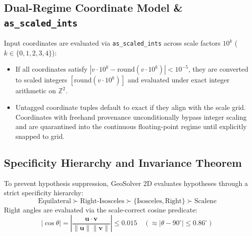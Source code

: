 \documentclass[preprint,12pt]{elsarticle}
\begin{document}
\subsection{Dual-Regime Coordinate Model \& \texttt{as\_scaled\_ints}}
Input coordinates are evaluated via \texttt{as\_scaled\_ints} across scale factors $10^k$ ($k \in \{0, 1, 2, 3, 4\}$):
\begin{itemize}
    \item If all coordinates satisfy $|v \cdot 10^k - \text{round}(v \cdot 10^k)| < 10^{-5}$, they are converted to scaled integers $[\text{round}(v \cdot 10^k)]$ and evaluated under exact integer arithmetic on $\mathbb{Z}^2$.
    \item Untagged coordinate tuples default to exact if they align with the scale grid. Coordinates with freehand provenance unconditionally bypass integer scaling and are quarantined into the continuous floating-point regime until explicitly snapped to grid.
\end{itemize}

\subsection{Specificity Hierarchy and Invariance Theorem}
To prevent hypothesis suppression, GeoSolver 2D evaluates hypotheses through a strict specificity hierarchy:
\begin{equation}
\text{Equilateral} \succ \text{Right-Isosceles} \succ \{\text{Isosceles}, \text{Right}\} \succ \text{Scalene}
\end{equation}
Right angles are evaluated via the scale-correct cosine predicate:
\begin{equation}
|\cos \theta| = \left| \frac{\mathbf{u} \cdot \mathbf{v}}{\|\mathbf{u}\| \|\mathbf{v}\|} \right| \le 0.015 \quad (\approx |\theta - 90^\circ| \le 0.86^\circ)
\end{equation}
\end{document}
